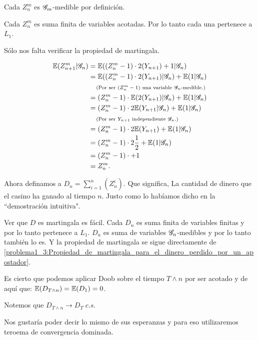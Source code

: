 	Cada $Z_n^m$ es $\mathscr{G}_m$-medible por definición.\pn
	
	Cada $Z_n^m$ es suma finita de variables acotadas. Por lo tanto cada una pertenece a $L_1$.\pn
	
	Sólo nos falta verificar la propiedad de martingala.\pn
	
	\begin{align}\label{problema1_3:Propiedad_de_martingala_para_el_dinero_perdido_por_un_apostador}
		\mathbb{E}(Z_{n+1}^{m} | \mathscr{G}_n) &= \mathbb{E}((Z_n^{m} - 1) \cdot 2(Y_{n+1}) + 1 | \mathscr{G}_n)					\\
							   &= \mathbb{E}((Z_n^{m} -1) \cdot 2(Y_{n+1}) | \mathscr{G}_n) + \mathbb{E}( 1 | \mathscr{G}_n)		\\
							   &\;\;\;\;\mbox{{\scriptsize(Por ser $(Z_n^{m} - 1)$ una variable $\mathscr{G}_n$-medible.)}}	\\
							   &= (Z_n^{m} -1) \cdot \mathbb{E}(  2(Y_{n+1}) | \mathscr{G}_n) + \mathbb{E}( 1 | \mathscr{G}_n)	\\
							   &= (Z_n^{m} -1) \cdot 2\mathbb{E}( Y_{n+1} | \mathscr{G}_n) + \mathbb{E}( 1 | \mathscr{G}_n)		\\
							   &\;\;\;\;\mbox{{\scriptsize(Por ser $Y_{n + 1}$ independiente $\mathscr{G}_n$.)}}				\\
							   &= (Z_n^{m} -1) \cdot 2\mathbb{E}( Y_{n+1}) + \mathbb{E}( 1 | \mathscr{G}_n)				\\
							   &= (Z_n^{m} -1) \cdot 2 \frac{1}{2} + \mathbb{E}( 1 | \mathscr{G}_n)				\\
							   &= (Z_n^{m} -1) \cdot + 1 										\\
							   &= Z_n^m.
	\end{align}\pn
	
	Ahora definamos a $D_n = \sum_{i=1}^n (Z_n^i)$. Que significa, La cantidad de dinero que el casino ha ganado al tiempo $n$. 
	Justo como lo habíamos dicho en la ``demostración intuitiva".\pn
	
	Ver que $D$ es martingala es fácil. Cada $D_n$ es suma finita de variables finitas y por lo tanto pertenece a $L_1$.
	$D_n$ es suma de variables $\mathscr{G}_n$-medibles y por lo tanto también lo es. Y la propiedad de martingala se sigue directamente de
	\eqref{problema1_3:Propiedad_de_martingala_para_el_dinero_perdido_por_un_apostador}.\pn
	
	Es cierto que podemos aplicar Doob sobre el tiempo $T \wedge n$ por ser acotado y de aquí que:
	$\mathbb{E}(D_{T \wedge n}) = \mathbb{E}(D_1) = 0$.\pn
	
	Notemos que $D_{T \wedge n} \longrightarrow D_T \; c.s.$\pn
	
	Nos gustaría poder decir lo mismo de sus esperanzas y para eso utilizaremos teroema de convergencia dominada.\pn
	
